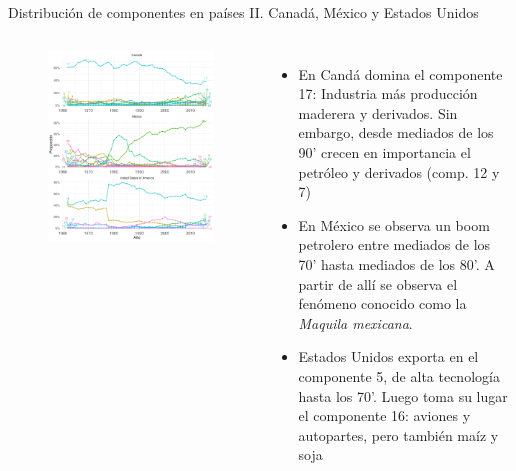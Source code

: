 \documentclass[compress]{beamer}
\begin{document}
\begin{frame}
\small
Distribución de componentes en países II. Canadá, México y Estados Unidos
\scriptsize
\begin{columns}[c] 

	\begin{figure}
		\includegraphics[width=\linewidth]{graficoLDA_k30_CAN_MEX_USA}
	\end{figure}
	
	
		\begin{itemize}[label=\faRebel]
		\item En Candá domina el componente 17: Industria más producción maderera y derivados. Sin embargo, desde mediados de los 90' crecen en importancia el petróleo y derivados (comp. 12 y 7)
		\item En México se observa un boom petrolero entre mediados de los 70' hasta mediados de los 80'. A partir de allí se observa el fenómeno conocido como la \textit{Maquila mexicana}.
		\item Estados Unidos exporta en el componente 5, de alta tecnología hasta los 70'. Luego toma su lugar el componente 16: aviones y autopartes, pero también maíz y soja
	\end{itemize}
	
\end{columns} 

\end{frame}
\end{document}
